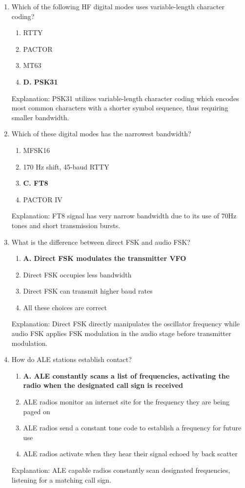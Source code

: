 \begin{enumerate}
        \item Which of the following HF digital modes uses variable-length character coding?
     \begin{enumerate}
       \item  RTTY
        \item  PACTOR
      \item  MT63
        \item \textbf{D. PSK31}
        \end{enumerate}
      \textcolor{myred}{Explanation:}
        PSK31 utilizes variable-length character coding which encodes most common characters with a shorter symbol sequence, thus requiring smaller bandwidth.
     
    \item Which of these digital modes has the narrowest bandwidth?
       \begin{enumerate}
       \item  MFSK16
         \item  170 Hz shift, 45-baud RTTY
         \item \textbf{C. FT8}
         \item  PACTOR IV
       \end{enumerate}
        \textcolor{myred}{Explanation:}
      FT8 signal has very narrow bandwidth due to its use of 70Hz tones and short transmission bursts.
        
    \item What is the difference between direct FSK and audio FSK?
       \begin{enumerate}
         \item \textbf{A. Direct FSK modulates the transmitter VFO}
      \item  Direct FSK occupies less bandwidth
      \item  Direct FSK can transmit higher baud rates
      \item  All these choices are correct
     \end{enumerate}
         \textcolor{myred}{Explanation:}
       Direct FSK directly manipulates the oscillator frequency while audio FSK applies FSK modulation in the audio stage before transmitter modulation.
        
        \item How do ALE stations establish contact?
         \begin{enumerate}
         \item \textbf{A. ALE constantly scans a list of frequencies, activating the radio when the designated call sign is received}
      \item  ALE radios monitor an internet site for the frequency they are being paged on
       \item  ALE radios send a constant tone code to establish a frequency for future use
        \item  ALE radios activate when they hear their signal echoed by back scatter
      \end{enumerate}
    \textcolor{myred}{Explanation:}
     ALE capable radios constantly scan designated frequencies, listening for a matching call sign.


\end{enumerate}
